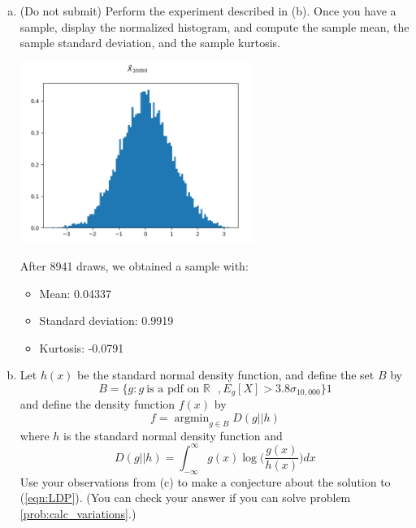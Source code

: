 \documentclass[12pt]{article}
\newcommand{\R}{\mathbb{R}}
\DeclareMathOperator*{\argmin}{\arg\min}
\begin{document}
\begin{enumerate}[1.]
\begin{enumerate}[(a)]
		      \item {\color{blue} (Do not submit)} Perform the experiment described in (b). Once you have a sample,
		            display the normalized histogram, and compute the sample mean, the sample standard deviation, and the sample kurtosis.

		            \begin{center}
			            \includegraphics[width=0.6\textwidth]{Images/HW1-normal.png}
		            \end{center}

		            \color{blue}
		            After 8941 draws, we obtained a sample with:
		            \begin{itemize}
			            \item Mean: 0.04337
			            \item Standard deviation: 0.9919
			            \item Kurtosis: -0.0791
		            \end{itemize}
		            \color{black}

		      \item
		            Let $h(x)$ be the standard normal density function, and define
		            the set $B$ by
		            \[
			            B = \big\{g: g\ \text{is a pdf on $\R$ }, E_g[X]>3.8\sigma_{10,000} \big\}1
		            \]
		            and define the density function $f(x)$ by
		            \begin{equation}
			            \label{eqn:LDP}
			            f = \argmin_{g \in B} D(g||h)
		            \end{equation}
		            where $h$ is the standard normal density function and
		            \[
			            D(g||h) = \int_{-\infty}^{\infty} g(x)\log \big(\frac{g(x)}{h(x)}\big) dx
		            \]
		            Use your observations from (c) to make a conjecture about the solution to (\ref{eqn:LDP}). (You can check your answer if you can solve problem \ref{prob:calc_variations}.)


\end{enumerate}
\end{enumerate}
\end{document}
